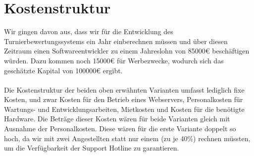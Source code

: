 \section{Kostenstruktur}
Wir gingen davon aus, dass wir für die Entwicklung des Turnierbewertungssystems ein Jahr einberechnen müssen und über
    diesen Zeitraum einen Softwareentwickler zu einem Jahreslohn von 85000€ beschäftigen würden.
Dazu kommen noch 15000€ für Werbezwecke, wodurch sich das geschätzte Kapital von 100000€ ergibt.
\\\\
Die Kostenstruktur der beiden oben erwähnten Varianten umfasst lediglich fixe Kosten, und zwar Kosten für den Betrieb
    eines Webservers, Personalkosten für Wartungs- und Entwicklungsarbeiten, Mietkosten und Kosten für die benötigte Hardware.
Die Beträge dieser Kosten wären für beide Varianten gleich mit Ausnahme der Personalkosten.
Diese wären für die erste Variante doppelt so hoch, da wir mit zwei Angestellten statt nur einem (zu je 40\%) rechnen
    müssten, um die Verfügbarkeit der Support Hotline zu garantieren.

